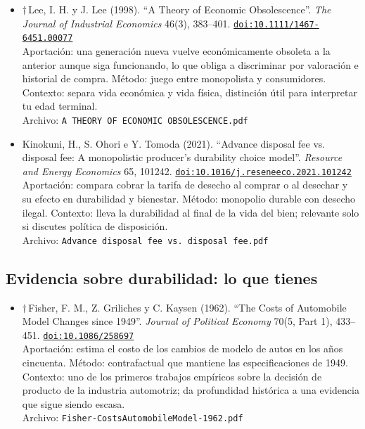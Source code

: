 \documentclass[11pt]{article}
\begin{document}
\begin{itemize}
{\footnotesize Archivo: \texttt{Planned Obsolescence and the Provision of.pdf}}
\item $\dagger$\,Lee, I. H. y J. Lee (1998). ``A Theory of Economic Obsolescence''. \textit{The Journal of Industrial Economics} 46(3), 383--401. \href{https://doi.org/10.1111/1467-6451.00077}{\texttt{doi:10.1111/1467-6451.00077}}\\
Aportación: una generación nueva vuelve económicamente obsoleta a la anterior aunque siga funcionando, lo que obliga a discriminar por valoración e historial de compra. Método: juego entre monopolista y consumidores. Contexto: separa vida económica y vida física, distinción útil para interpretar tu edad terminal.\\
{\footnotesize Archivo: \texttt{A THEORY OF ECONOMIC OBSOLESCENCE.pdf}}
\item Kinokuni, H., S. Ohori e Y. Tomoda (2021). ``Advance disposal fee vs. disposal fee: A monopolistic producer’s durability choice model''. \textit{Resource and Energy Economics} 65, 101242. \href{https://doi.org/10.1016/j.reseneeco.2021.101242}{\texttt{doi:10.1016/j.reseneeco.2021.101242}}\\
Aportación: compara cobrar la tarifa de desecho al comprar o al desechar y su efecto en durabilidad y bienestar. Método: monopolio durable con desecho ilegal. Contexto: lleva la durabilidad al final de la vida del bien; relevante solo si discutes política de disposición.\\
{\footnotesize Archivo: \texttt{Advance disposal fee vs. disposal fee.pdf}}
\end{itemize}

\subsection*{Evidencia sobre durabilidad: lo que tienes}
\begin{itemize}
\item $\dagger$\,Fisher, F. M., Z. Griliches y C. Kaysen (1962). ``The Costs of Automobile Model Changes since 1949''. \textit{Journal of Political Economy} 70(5, Part 1), 433--451. \href{https://doi.org/10.1086/258697}{\texttt{doi:10.1086/258697}}\\
Aportación: estima el costo de los cambios de modelo de autos en los años cincuenta. Método: contrafactual que mantiene las especificaciones de 1949. Contexto: uno de los primeros trabajos empíricos sobre la decisión de producto de la industria automotriz; da profundidad histórica a una evidencia que sigue siendo escasa.\\
{\footnotesize Archivo: \texttt{Fisher-CostsAutomobileModel-1962.pdf}}
\end{itemize}
\end{document}

